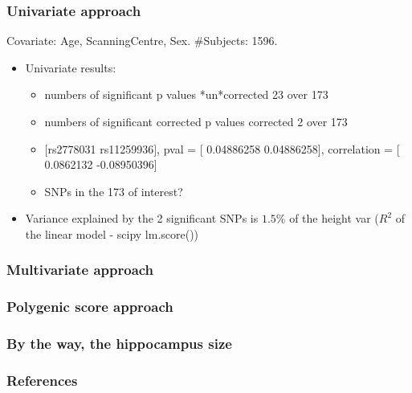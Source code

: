 \documentclass[utf8]{beamer}
\begin{document}
\begin{frame}
\frametitle{Univariate approach}
Covariate: Age, ScanningCentre, Sex. $\#$Subjects: 1596.
\vspace{1cm}
\begin{itemize}
\item Univariate results:
	\begin{itemize}
	\item numbers of significant p values *un*corrected 23 over 173
	\item numbers of significant corrected p values corrected 2 over  173
	\item $[$rs2778031 rs11259936$]$, pval =  [ 0.04886258  0.04886258],  correlation =  [ 0.0862132  -0.08950396]
	\item SNPs in the 173 of interest?
	\end{itemize}
\vspace{0.5cm}
\item Variance explained by the 2 significant SNPs is $1.5\%$ of the height var
      ($R^2$ of the linear model - scipy lm.score())
\end{itemize}

\end{frame}

\begin{frame}
\frametitle{Multivariate approach}
\end{frame}



\begin{frame}
\frametitle{Polygenic score approach}
\end{frame}

\begin{frame}
\frametitle{By the way, the hippocampus size}
\end{frame}


\begin{frame}[shrink=50,t]
\frametitle{References}
\small
\end{frame}

%
\end{document}
